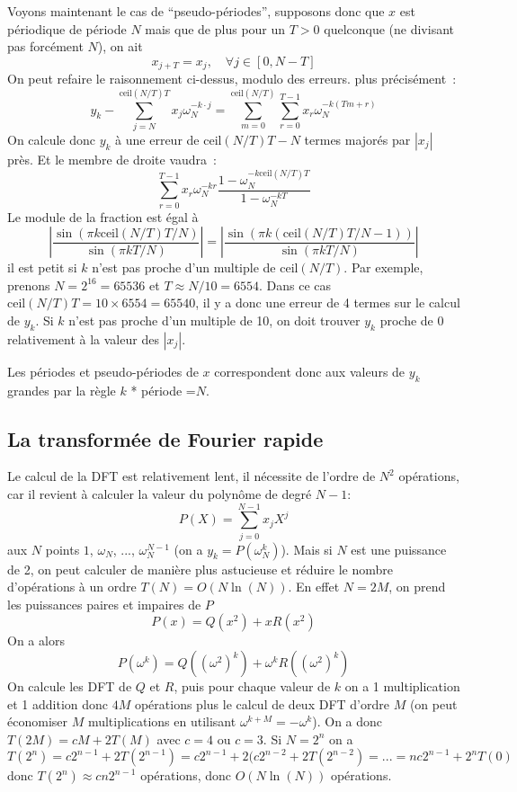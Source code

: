\documentclass[a4paper,11pt]{article}
\begin{document}
\begin{giacjshere}
Voyons maintenant le cas de ``pseudo-périodes'', supposons donc
que $x$ est périodique de période $N$ mais que de plus pour un $T>0$ 
quelconque (ne divisant pas forcément $N$), on ait
\[ x_{j+T}=x_j, \quad \forall j \in[0,N-T] \]
On peut refaire le raisonnement ci-dessus, modulo des erreurs.
plus précisément~:
\[ y_k - \sum_{j=N}^{\mbox{ceil}(N/T)T}x_j \omega_N^{-k\cdot j} 
= \sum_{m=0}^{\mbox{ceil}(N/T)} \sum_{r=0}^{T-1} x_r \omega_N^{-k (T m+r)} \]
On calcule donc $y_k$ à une erreur de $\mbox{ceil}(N/T)T-N$ termes majorés
par $|x_j|$ près.
Et le membre de droite vaudra~:
\[ \sum_{r=0}^{T-1} x_r \omega_N^{-kr} 
\frac{1-\omega_N^{-k\mbox{ceil}(N/T) T}}{1-\omega_N^{-kT}}
\]
Le module de la fraction est égal à
\[ |\frac{\sin(\pi k \mbox{ceil}(N/T) T/N)}{\sin(\pi k T/N)} |
= |\frac{\sin(\pi k (\mbox{ceil}(N/T) T/N-1))}{\sin(\pi k T/N)} |
\]
il est petit si $k$ n'est pas proche d'un multiple de $\mbox{ceil}(N/T)$.
Par exemple, prenons $N=2^16=65536$ et $T \approx N/10 =6554$. Dans
ce cas $\mbox{ceil}(N/T)T=10 \times 6554=65540$, il y a donc une erreur
de 4 termes sur le calcul de $y_k$. Si $k$ n'est pas proche d'un multiple
de 10, on doit trouver $y_k$ proche de 0 relativement à la valeur des $|x_j|$.

Les périodes et pseudo-périodes de $x$ correspondent donc aux
valeurs de $y_k$ grandes par la règle $k$ * période =$N$.

\subsection{La transformée de Fourier rapide}
Le calcul de la DFT est relativement lent, il nécessite de l'ordre
de $N^2$ opérations, car il revient à calculer la valeur du polynôme
de degré $N-1$:
\[ P(X)=\sum_{j=0}^{N-1} x_j X^j \]
aux $N$ points $1$, $\omega_N$, ..., $\omega_N^{N-1}$ 
(on a $y_k=P(\omega_N^k)$).
Mais si $N$ est une puissance de 2, on peut calculer de manière plus
astucieuse et réduire le nombre d'opérations à un ordre $T(N)=O(N \ln(N))$.
En effet $N=2M$,
on prend les
puissances paires et impaires de $P$
$$ P(x)=Q(x^2)+xR(x^2)$$
On a alors
$$ P(\omega^k)=Q( (\omega^2)^k)+\omega^k R((\omega^2)^k)$$
On calcule les DFT de $Q$ et $R$, puis pour chaque valeur de $k$ on a
1 multiplication et 1 addition donc $4M$ op\'erations plus le calcul
de deux DFT d'ordre $M$ (on peut \'economiser $M$ multiplications
en utilisant $\omega^{k+M} =-\omega^k$). On a donc $T(2M)=cM+2T(M)$
avec $c=4$ ou $c=3$. Si $N=2^n$ on a 
$$T(2^n)=c2^{n-1}+2T(2^{n-1})
= c2^{n-1}+2(c2^{n-2}+2T(2^{n-2})
=...=nc2^{n-1}+2^nT(0)$$
donc $T(2^n) \approx cn2^{n-1}$ op\'erations, donc $O(N\ln(N))$
opérations.


\end{giacjshere}
\end{document}
